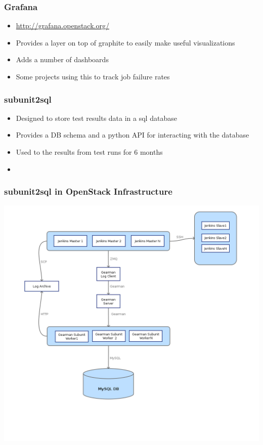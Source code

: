 \documentclass[aspectratio=169,11pt,hyperref={colorlinks=true}]{beamer}
\begin{document}
\begin{frame}
    \frametitle{Grafana}
    \begin{itemize}
        \item \href{http://grafana.openstack.org/}{http://grafana.openstack.org/}
        \item Provides a layer on top of graphite to easily make useful visualizations
        \item Adds a number of dashboards
        \item Some projects using this to track job failure rates
    \end{itemize}
\end{frame}

\begin{frame}
    \frametitle{subunit2sql}
    \begin{itemize}
        \item Designed to store test results data in a sql database
        \item Provides a DB schema and a python API for interacting with the
              database
        \item Used to the results from test runs for 6 months
        \item
    \end{itemize}
\end{frame}

\begin{frame}
    \frametitle{subunit2sql in OpenStack Infrastructure}
    \begin{center}
        \includegraphics[height=1.1\textheight]{subunit2sql-collection.png}
    \end{center}
\end{frame}
\end{document}
